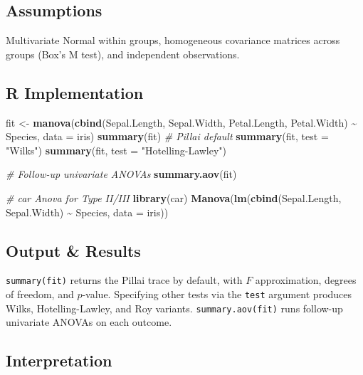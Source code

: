 \documentclass[
]{article}
\newenvironment{Shaded}{\begin{snugshade}}{\end{snugshade}}
\newcommand{\AttributeTok}[1]{\textcolor[rgb]{0.13,0.29,0.53}{#1}}
\newcommand{\CommentTok}[1]{\textcolor[rgb]{0.56,0.35,0.01}{\textit{#1}}}
\newcommand{\FunctionTok}[1]{\textcolor[rgb]{0.13,0.29,0.53}{\textbf{#1}}}
\newcommand{\NormalTok}[1]{#1}
\newcommand{\OtherTok}[1]{\textcolor[rgb]{0.56,0.35,0.01}{#1}}
\newcommand{\SpecialCharTok}[1]{\textcolor[rgb]{0.81,0.36,0.00}{\textbf{#1}}}
\newcommand{\StringTok}[1]{\textcolor[rgb]{0.31,0.60,0.02}{#1}}
\begin{document}
\subsection{Assumptions}\label{assumptions}

Multivariate Normal within groups, homogeneous covariance matrices
across groups (Box's M test), and independent observations.

\subsection{R Implementation}\label{r-implementation}

\begin{Shaded}
\begin{Highlighting}[]
\NormalTok{fit }\OtherTok{\textless{}{-}} \FunctionTok{manova}\NormalTok{(}\FunctionTok{cbind}\NormalTok{(Sepal.Length, Sepal.Width, Petal.Length, Petal.Width) }\SpecialCharTok{\textasciitilde{}}
\NormalTok{              Species, }\AttributeTok{data =}\NormalTok{ iris)}
\FunctionTok{summary}\NormalTok{(fit)                     }\CommentTok{\# Pillai default}
\FunctionTok{summary}\NormalTok{(fit, }\AttributeTok{test =} \StringTok{"Wilks"}\NormalTok{)}
\FunctionTok{summary}\NormalTok{(fit, }\AttributeTok{test =} \StringTok{"Hotelling{-}Lawley"}\NormalTok{)}

\CommentTok{\# Follow{-}up univariate ANOVAs}
\FunctionTok{summary.aov}\NormalTok{(fit)}

\CommentTok{\# car Anova for Type II/III}
\FunctionTok{library}\NormalTok{(car)}
\FunctionTok{Manova}\NormalTok{(}\FunctionTok{lm}\NormalTok{(}\FunctionTok{cbind}\NormalTok{(Sepal.Length, Sepal.Width) }\SpecialCharTok{\textasciitilde{}}\NormalTok{ Species, }\AttributeTok{data =}\NormalTok{ iris))}
\end{Highlighting}
\end{Shaded}

\subsection{Output \& Results}\label{output-results}

\texttt{summary(fit)} returns the Pillai trace by default, with \(F\)
approximation, degrees of freedom, and \(p\)-value. Specifying other
tests via the \texttt{test} argument produces Wilks, Hotelling-Lawley,
and Roy variants. \texttt{summary.aov(fit)} runs follow-up univariate
ANOVAs on each outcome.

\subsection{Interpretation}\label{interpretation}
\end{document}

